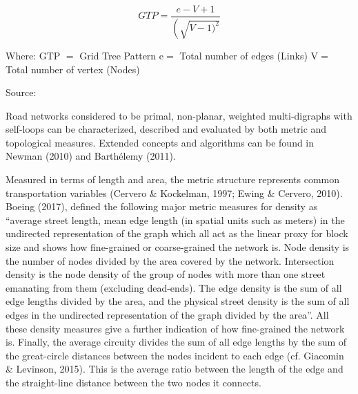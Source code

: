 \begin{equation}
{GTP}=\frac{e-V+1}{\left(\sqrt{V-1)^{2}}\right.}
\end{equation}

Where:
GTP $=$ Grid Tree Pattern
$\mathrm{e}=$ Total number of edges (Links)
$\mathrm{V}=$ Total number of vertex (Nodes)
\caption{Source: \cite{Tini:2018}}

Road networks considered to be primal, non-planar, weighted multi-digraphs with self-loops can be characterized, described and evaluated by both metric and topological measures. Extended concepts and algorithms can be found in Newman (2010) and Barthélemy (2011). 

Measured in terms of length and area, the metric structure represents common transportation variables (Cervero \& Kockelman, 1997; Ewing \& Cervero, 2010). Boeing (2017), defined the following major metric measures for density as “average street length, mean edge length (in spatial units such as meters) in the undirected representation of the graph which all act as the linear proxy for block size and shows how fine-grained or coarse-grained the network is. Node density is the number of nodes divided by the area covered by the network. Intersection density is the node density of the group of nodes with more than one street emanating from them (excluding dead-ends). The edge density is the sum of all edge lengths divided by the area, and the physical street density is the sum of all edges in the undirected representation of the graph divided by the area”. All these density measures give a further indication of how fine-grained the network is. Finally, the average circuity divides the sum of all edge lengths by the sum of the great-circle distances between the nodes incident to each edge (cf. Giacomin \& Levinson, 2015). This is the average ratio between the length of the edge and the straight-line distance between the two nodes it connects.

